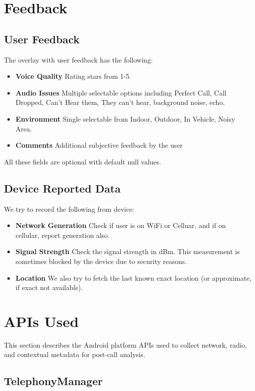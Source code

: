 \documentclass{article}
\theoremstyle{plain}
\theoremstyle{definition}
\theoremstyle{remark}
\begin{document}
\section{Feedback}

\subsection{User Feedback}
The overlay with user feedback has the following:
\begin{itemize}
    \item \textbf{Voice Quality} Rating stars from 1-5
    \item \textbf{Audio Issues} Multiple selectable options including Perfect Call, Call Dropped, Can't Hear them, They can't hear, background noise, echo.
    \item \textbf{Environment} Single selectable from Indoor, Outdoor, In Vehicle, Noisy Area.
    \item \textbf{Comments} Additional subjective feedback by the user
\end{itemize}
All these fields are optional with default null values.

\subsection{Device Reported Data}
We try to record the following from device:
\begin{itemize}
    \item \textbf{Network Generation} Check if user is on WiFi or Celluar, and if on cellular, report generation also.
    \item \textbf{Signal Strength} Check the signal strength in dBm. This measurement is sometimes blocked by the device due to security reasons.
    \item \textbf{Location} We also try to fetch the last known exact location (or approximate, if exact not available).
\end{itemize}

\section{APIs Used}

This section describes the Android platform APIs used to collect network, radio, and contextual metadata for post-call analysis.

\subsection{TelephonyManager}
\end{document}
